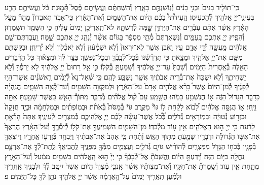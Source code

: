 \documentclass[twoside, openany, parskip=half, 11pt]{book}
\begin{document}
\begin{footnotesize}
\begin{multicols}{2}
\\
כִּֽי־תוֹלִ֤יד בָּנִים֙ וּבְנֵ֣י בָנִ֔ים וְ֯נֽוֹשַׁנְתֶּ֖ם בָּאָ֑רֶץ וְ֯הִשְׁחַתֶּ֗ם וַֽעֲשִׂ֤יתֶם פֶּ֨סֶל֙ תְּ֯מ֣וּנַת כֹּ֔ל וַֽעֲשִׂיתֶ֥ם הָרַ֛ע בְּעֵינֵֽי־יְיָ֥ אֱלֹהֶ֖יךָ לְ֯הַכְעִיסֽוֹ׃ הַֽעִידֹ֩תִי֩ בָכֶ֨ם הַיּ֜וֹם אֶת־הַשָּׁמַ֣יִם וְ֯אֶת־הָאָ֗רֶץ כִּֽי־אָבֹ֣ד תֹּֽאבֵדוּן֘ מַהֵר֒ מֵעַ֣ל הָאָ֔רֶץ אֲשֶׁ֨ר אַתֶּ֜ם עֹֽבְ֯רִ֧ים אֶת־הַיַּרְדֵּ֛ן שׇׇׇׇׇׇׁ֖מָּה לְ֯רִשְׁתָּ֑הּ לֹא־תַֽאֲרִיכֻ֤ן יָמִים֙ עָלֶ֔יהָ כִּ֥י הִשָּׁמֵ֖ד תִּשָּֽׁמֵדֽוּן׃ וְ֯הֵפִ֧יץ יְיָ֛ אֶתְכֶ֖ם בָּֽעַמִּ֑ים וְ֯נִשְׁאַרְתֶּם֙ מְ֯תֵ֣י מִסְפָּ֔ר בַּגּוֹיִ֕ם אֲשֶׁ֨ר יְ֯נַהֵ֧ג יְיָ֛ אֶתְכֶ֖ם שׇׇׇׇׇׇׇׇֽׁמָּה׃ וַֽעֲבַדְתֶּם־שָׁ֣ם אֱלֹהִ֔ים מַֽעֲשֵׂ֖ה יְ֯דֵ֣י אָדָ֑ם עֵ֣ץ וָאֶ֔בֶן אֲשֶׁ֤ר לֹֽא־יִרְאוּן֙ וְ֯לֹ֣א יִשְׁמְ֯ע֔וּן וְ֯לֹ֥א יֹֽאכְ֯ל֖וּן וְ֯לֹ֥א יְ֯רִיחֻֽן׃ וּבִקַּשְׁתֶּ֥ם מִשָּׁ֛ם אֶת־יְיָ֥ אֱלֹהֶ֖יךָ וּמָצָ֑אתָ כִּ֣י תִדְרְ֯שֶׁ֔נּוּ בְּ֯כׇל־לְ֯בָֽבְ֯ךָ֖ וּבְכׇל־נַפְשֶֽׁךָ׃
בַּצַּ֣ר לְ֯ךָ֔ וּמְצָא֕וּךָ כֹּ֖ל הַדְּ֯בָרִ֣ים הָאֵ֑לֶּה בְּ֯אַֽחֲרִית֙ הַיָּמִ֔ים וְ֯שַׁבְתָּ֙ עַד־יְיָ֣ אֱלֹהֶ֔יךָ וְ֯שָֽׁמַעְתָּ֖ בְּ֯קֹלֽוֹ׃ כִּ֣י אֵ֤ל רַחוּם֙ יְיָ֣ אֱלֹהֶ֔יךָ לֹ֥א יַרְפְּ֯ךָ֖ וְ֯לֹ֣א יַשְׁחִיתֶ֑ךָ וְ֯לֹ֤א יִשְׁכַּח֙ אֶת־בְּ֯רִ֣ית אֲבֹתֶ֔יךָ אֲשֶׁ֥ר נִשְׁבַּ֖ע לָהֶֽם׃ כִּ֣י שְׁ֯אַל־נָא֩ לְ֯יָמִ֨ים רִֽאשֹׁנִ֜ים אֲשֶׁר־הָי֣וּ לְ֯פָנֶ֗יךָ לְ֯מִן־הַיּוֹם֙ אֲשֶׁר֩ בָּרָ֨א אֱלֹהִ֤ים אָדָם֙ עַל־הָאָ֔רֶץ וּלְמִקְצֵ֥ה הַשָּׁמַ֖יִם וְ֯עַד־קְ֯צֵ֣ה הַשָּׁמָ֑יִם הֲנִֽהְיָ֗ה כַּדָּבָ֤ר הַגָּדוֹל֙ הַזֶּ֔ה א֖וֹ הֲנִשְׁמַ֥ע כָּמֹֽהוּ׃ הֲשָׁ֣מַֽע עָם֩ ק֨וֹל אֱלֹהִ֜ים מְ֯דַבֵּ֧ר מִתּוֹךְ֯־הָאֵ֛שׁ כַּֽאֲשֶׁר־שָׁמַ֥עְתָּ אַתָּ֖ה וַיֶּֽחִי׃ א֣וֹ הֲנִסָּ֣ה אֱלֹהִ֗ים לָ֠ב֠וֹא לָקַ֨חַת ל֣וֹ גּוֹי֘ מִקֶּ֣רֶב גּוֹי֒ בְּ֯מַסֹּת֩ בְּ֯אֹתֹ֨ת וּבְמֽוֹפְתִ֜ים וּבְמִלְחָמָ֗ה וּבְיָ֤ד חֲזָקָה֙ וּבִזְר֣וֹעַ נְ֯טוּיָ֔ה וּבְמֽוֹרָאִ֖ים גְּ֯דֹלִ֑ים כְּ֠֯כֹ֠ל אֲשֶׁר־עָשָׂ֨ה לָכֶ֜ם יְיָ֧ אֱלֹֽהֵיכֶ֛ם בְּ֯מִצְרַ֖יִם לְ֯עֵינֶֽיךָ׃ אַתָּה֙ הָרְ֯אֵ֣תָ לָדַ֔עַת כִּ֥י יְיָ֖ ה֣וּא הָֽאֱלֹהִ֑ים אֵ֥ין ע֖וֹד מִלְּ֯בַדּֽוֹ׃
מִן־הַשָּׁמַ֛יִם הִשְׁמִֽיעֲךָ֥ אֶת־קֹל֖וֹ לְ֯יַסְּ֯רֶ֑ךָּ וְ֯עַל־הָאָ֗רֶץ הֶרְאֲךָ֙ אֶת־אִשּׁ֣וֹ הַגְּ֯דוֹלָ֔ה וּדְבָרָ֥יו שָׁמַ֖עְתָּ מִתּ֥וֹךְ הָאֵֽשׁ׃ וְ֯תַ֗חַת כִּ֤י אָהַב֙ אֶת־אֲבֹתֶ֔יךָ וַיִּבְחַ֥ר בְּ֯זַרְע֖וֹ אַֽחֲרָ֑יו וַיּוֹצִֽאֲךָ֧ בְּ֯פָנָ֛יו בְּ֯כֹח֥וֹ הַגָּדֹ֖ל מִמִּצְרָֽיִם׃ לְ֯הוֹרִ֗ישׁ גּוֹיִ֛ם גְּ֯דֹלִ֧ים וַֽעֲצֻמִ֛ים מִמְּ֯ךָ֖ מִפָּנֶ֑יךָ לַֽהֲבִֽיאֲךָ֗ לָֽתֶת־לְ֯ךָ֧ אֶת־אַרְצָ֛ם נַֽחֲלָ֖ה כַּיּ֥וֹם הַזֶּֽה׃ וְ֯יָֽדַעְתָּ֣ הַיּ֗וֹם וַֽהֲשֵֽׁבֹתָ֘ אֶל־לְ֯בָבֶ֒ךָ֒ כִּ֤י יְיָ֙ ה֣וּא הָֽאֱלֹהִ֔ים בַּשָּׁמַ֣יִם מִמַּ֔עַל וְ֯עַל־הָאָ֖רֶץ מִתָּ֑חַת אֵ֖ין עֽוֹד׃ וְ֯שָֽׁמַרְתָּ֞ אֶת־חֻקָּ֣יו וְ֯אֶת־מִצְוֹתָ֗יו אֲשֶׁ֨ר אָֽנֹכִ֤י מְ֯צַוְּךָ֙ הַיּ֔וֹם אֲשֶׁר֙ יִיטַ֣ב לְ֯ךָ֔ וּלְבָנֶ֖יךָ אַֽחֲרֶ֑יךָ וּלְמַ֨עַן תַּֽאֲרִ֤יךְ יָמִים֙ עַל־הָ֣אֲדָמָ֔ה אֲשֶׁ֨ר יְיָ֤ אֱלֹהֶ֛יךָ נֹתֵ֥ן לְ֯ךָ֖ כׇּל־הַיָּמִֽים׃ פ


\end{multicols}
\end{footnotesize}
\end{document}

